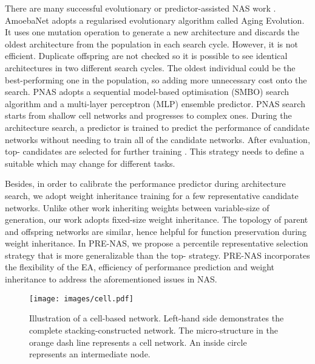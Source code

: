 \documentclass[sigconf]{acmart}
\begin{document}
There are many successful evolutionary or predictor-assisted NAS work \cite{Ref:07,Ref:08,Ref:27,Ref:36,Ref:37,Ref:40,Ref:41,Ref:51}. AmoebaNet \cite{Ref:08} adopts a regularised evolutionary algorithm called Aging Evolution.  It uses one mutation operation to generate a new architecture and discards the oldest architecture from the population in each search cycle.  However, it is not efficient.  Duplicate offspring are not checked so it is possible to see identical architectures in two different search cycles.  The oldest individual could be the best-performing one in the population, so adding more unnecessary cost onto the search.  PNAS \cite{Ref:40} adopts a sequential model-based optimisation (SMBO) search algorithm and a multi-layer perceptron (MLP) ensemble predictor.  PNAS search starts from shallow cell networks and progresses to complex ones.  During the architecture search, a predictor is trained to predict the performance of candidate networks without needing to train all of the candidate networks.  After evaluation, top- candidates are selected for further training \cite{Ref:40}.  This strategy needs to define a suitable  which may change for different tasks.  

Besides, in order to calibrate the performance predictor during architecture search, we adopt weight inheritance training for a few representative candidate networks.  Unlike other work \cite{Ref:55,Ref:36} inheriting weights between variable-size of generation, our work adopts fixed-size weight inheritance.  The topology of parent and offspring networks are similar, hence helpful for function preservation during weight inheritance.
In PRE-NAS, we propose a percentile representative selection strategy that is more generalizable than the top- strategy.  PRE-NAS incorporates the flexibility of the EA, efficiency of performance prediction and weight inheritance to address the aforementioned issues in NAS. 



 \begin{figure}[!t]
    \begin{center}
  	\texttt{[image: images/cell.pdf]}
  	\caption{Illustration of a cell-based network. Left-hand side demonstrates the complete stacking-constructed network. The micro-structure in the orange dash line represents a cell network. An inside circle represents an intermediate node.}
  	\label{cell}
  	\end{center}
\end{figure} 
\end{document}
